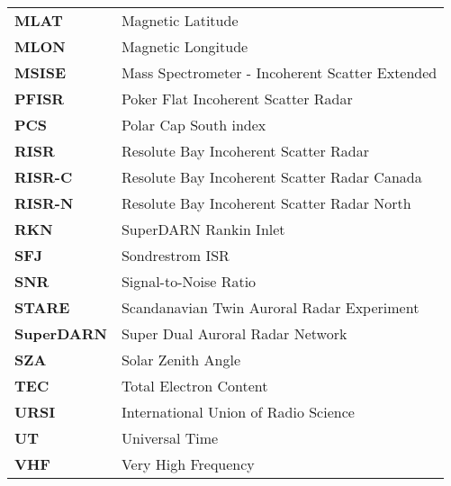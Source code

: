 \begin{longtable}{ll}
\textbf{MLAT} & Magnetic Latitude \\
\textbf{MLON} & Magnetic Longitude \\
\textbf{MSISE} & Mass Spectrometer - Incoherent Scatter Extended \\
\textbf{PFISR} & Poker Flat Incoherent Scatter Radar \\
\textbf{PCS} & Polar Cap South index \\
\textbf{RISR} & Resolute Bay Incoherent Scatter Radar \\
\textbf{RISR-C} & Resolute Bay Incoherent Scatter Radar Canada \\
\textbf{RISR-N} & Resolute Bay Incoherent Scatter Radar North \\
\textbf{RKN} & SuperDARN Rankin Inlet \\
\textbf{SFJ} & Sondrestrom ISR \\
\textbf{SNR} & Signal-to-Noise Ratio \\
\textbf{STARE} & Scandanavian Twin Auroral Radar Experiment \\
\textbf{SuperDARN} & Super Dual Auroral Radar Network \\
\textbf{SZA} & Solar Zenith Angle \\
\textbf{TEC} & Total Electron Content \\
\textbf{URSI} & International Union of Radio Science \\
\textbf{UT} & Universal Time \\
\textbf{VHF} & Very High Frequency \\
\end{longtable}